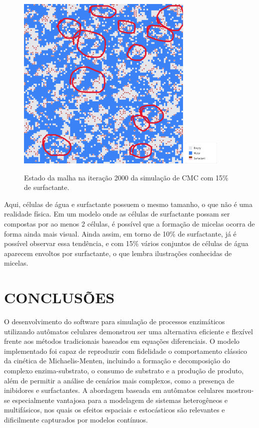\documentclass[12pt,oneside]{report}
\begin{document}
\begin{figure}[H]
    \centering
    \includegraphics[width=0.75\textwidth]{img/cmc_15perc_2000.png}
    \hspace{0.05\textwidth}
    \includegraphics[width=0.15\textwidth]{img/legend_cmc.png}
    \caption{\small Estado da malha na iteração 2000 da simulação de CMC com 15\% de surfactante.}
    \label{fig:cmc_15perc_2000}
\end{figure}

Aqui, células de água e surfactante possuem o mesmo tamanho, o que não é uma realidade física. Em um modelo onde as células de surfactante possam ser compostas por ao menos 2 células, é possível que a formação de micelas ocorra de forma ainda mais visual. Ainda assim, em torno de 10\% de surfactante, já é possível observar essa tendência, e com 15\% vários conjuntos de células de água aparecem envoltos por surfactante, o que lembra ilustrações conhecidas de micelas.

\chapter{CONCLUSÕES}

O desenvolvimento do software para simulação de processos enzimáticos utilizando autômatos celulares demonstrou ser uma alternativa eficiente e flexível frente aos métodos tradicionais baseados em equações diferenciais. O modelo implementado foi capaz de reproduzir com fidelidade o comportamento clássico da cinética de Michaelis-Menten, incluindo a formação e decomposição do complexo enzima-substrato, o consumo de substrato e a produção de produto, além de permitir a análise de cenários mais complexos, como a presença de inibidores e surfactantes. A abordagem baseada em autômatos celulares mostrou-se especialmente vantajosa para a modelagem de sistemas heterogêneos e multifásicos, nos quais os efeitos espaciais e estocásticos são relevantes e dificilmente capturados por modelos contínuos.
\end{document}
